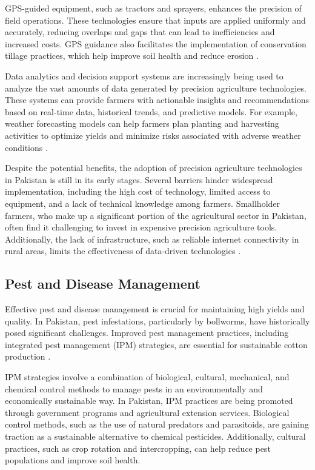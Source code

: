 \documentclass[12pt]{article}
\begin{document}
GPS-guided equipment, such as tractors and sprayers, enhances the precision of field operations. These technologies ensure that inputs are applied uniformly and accurately, reducing overlaps and gaps that can lead to inefficiencies and increased costs. GPS guidance also facilitates the implementation of conservation tillage practices, which help improve soil health and reduce erosion \cite{miller2019}.

Data analytics and decision support systems are increasingly being used to analyze the vast amounts of data generated by precision agriculture technologies. These systems can provide farmers with actionable insights and recommendations based on real-time data, historical trends, and predictive models. For example, weather forecasting models can help farmers plan planting and harvesting activities to optimize yields and minimize risks associated with adverse weather conditions \cite{qasim2022}.

Despite the potential benefits, the adoption of precision agriculture technologies in Pakistan is still in its early stages. Several barriers hinder widespread implementation, including the high cost of technology, limited access to equipment, and a lack of technical knowledge among farmers. Smallholder farmers, who make up a significant portion of the agricultural sector in Pakistan, often find it challenging to invest in expensive precision agriculture tools. Additionally, the lack of infrastructure, such as reliable internet connectivity in rural areas, limits the effectiveness of data-driven technologies \cite{ali2019}.

\subsection{Pest and Disease Management}

Effective pest and disease management is crucial for maintaining high yields and quality. In Pakistan, pest infestations, particularly by bollworms, have historically posed significant challenges. Improved pest management practices, including integrated pest management (IPM) strategies, are essential for sustainable cotton production \cite{usda2023, usda2021}.

IPM strategies involve a combination of biological, cultural, mechanical, and chemical control methods to manage pests in an environmentally and economically sustainable way. In Pakistan, IPM practices are being promoted through government programs and agricultural extension services. Biological control methods, such as the use of natural predators and parasitoids, are gaining traction as a sustainable alternative to chemical pesticides. Additionally, cultural practices, such as crop rotation and intercropping, can help reduce pest populations and improve soil health.
\end{document}
